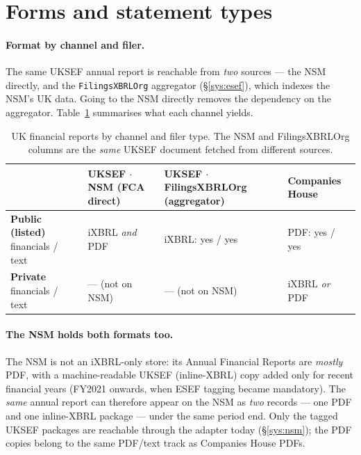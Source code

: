 \documentclass[11pt,a4paper]{report}
\begin{document}
\section{Forms and statement types}
\label{sec:uk-forms}

\paragraph{Format by channel and filer.} The same UKSEF annual report is reachable from \emph{two}
sources --- the NSM directly, and the \texttt{FilingsXBRLOrg} aggregator (\S\ref{sys:esef}), which
indexes the NSM's UK data. Going to the NSM directly removes the dependency on the aggregator.
Table~\ref{tab:uk-channels} summarises what each channel yields.

\begin{table}[h]
\centering
\caption{UK financial reports by channel and filer type. The NSM and FilingsXBRLOrg columns are the
\emph{same} UKSEF document fetched from different sources.}
\label{tab:uk-channels}
\begin{tabular}{@{}p{}p{}p{}p{}@{}}
\toprule
 & \textbf{UKSEF $\cdot$ NSM} (FCA direct) & \textbf{UKSEF $\cdot$ FilingsXBRLOrg} (aggregator) & \textbf{Companies House} \\
\midrule
\textbf{Public (listed)} \newline financials / text & iXBRL \emph{and} PDF & iXBRL: yes / yes & PDF: yes / yes \\
\textbf{Private} \newline financials / text & --- (not on NSM) & --- (not on NSM) & iXBRL \emph{or} PDF \\
\bottomrule
\end{tabular}
\end{table}

\paragraph{The NSM holds both formats too.} The NSM is not an iXBRL-only store: its Annual Financial
Reports are \emph{mostly} PDF, with a machine-readable UKSEF (inline-XBRL) copy added only for recent
financial years (FY2021 onwards, when ESEF tagging became mandatory). The \emph{same} annual report
can therefore appear on the NSM as \emph{two} records --- one PDF and one inline-XBRL package --- under
the same period end. Only the tagged UKSEF packages are reachable through the adapter today
(\S\ref{sys:nsm}); the PDF copies belong to the same PDF/text track as Companies House PDFs.
\end{document}
